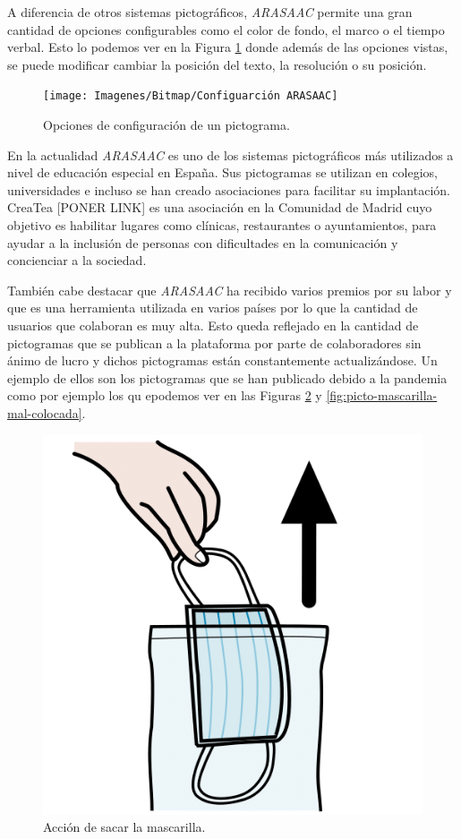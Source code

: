 A diferencia de otros sistemas pictográficos, \textit{ARASAAC} permite una gran cantidad de opciones configurables como el color de fondo, el marco o el tiempo verbal. Esto lo podemos ver en la Figura \ref{fig:configuarcion-arasaac} donde además de las opciones vistas, se puede modificar cambiar la posición del texto, la resolución o su posición.



\begin{figure}[h!]
	\centering
	\texttt{[image: Imagenes/Bitmap/Configuarción ARASAAC]}
	\caption{Opciones de configuración de un pictograma.}
	\label{fig:configuarcion-arasaac}
\end{figure}



En la actualidad \textit{ARASAAC} es uno de los sistemas pictográficos más utilizados a nivel de educación especial en España. Sus pictogramas se utilizan en colegios, universidades e incluso se han creado asociaciones para facilitar su implantación. CreaTea [PONER LINK] es una asociación en la Comunidad de Madrid cuyo objetivo es habilitar lugares como clínicas, restaurantes o ayuntamientos, para ayudar a la inclusión de personas con dificultades en la comunicación y concienciar a la sociedad.

También cabe destacar que \textit{ARASAAC} ha recibido varios premios por su labor y que es una herramienta utilizada en varios países por lo que la cantidad de usuarios que colaboran es muy alta. Esto queda reflejado en la cantidad de pictogramas que se publican a la plataforma por parte de colaboradores sin ánimo de lucro y dichos pictogramas están constantemente actualizándose. Un ejemplo de ellos son los pictogramas que se han publicado debido a la pandemia como por ejemplo los qu epodemos ver en las Figuras \ref{fig:picto-mascarilla} y \ref{fig:picto-mascarilla-mal-colocada}.


\begin{figure}[h!]
	\centering
	\includegraphics[width=0.2\linewidth]{Imagenes/Bitmap/Picto Mascarilla}
	\caption{Acción de sacar la mascarilla.}
	\label{fig:picto-mascarilla}
\end{figure}

